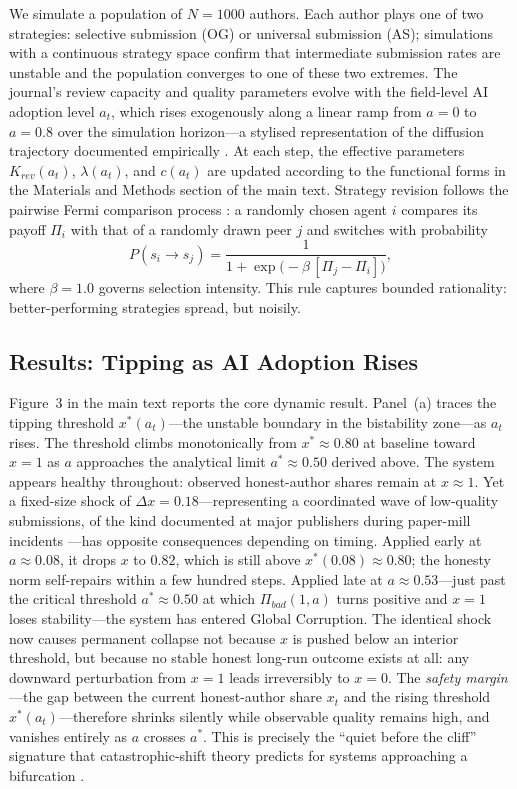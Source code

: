 \documentclass{article}
\begin{document}
We simulate a population of $N = 1000$ authors.
Each author plays one of two strategies: selective submission (OG) or universal submission (AS); simulations with a continuous strategy space confirm that intermediate submission rates are unstable and the population converges to one of these two extremes.
The journal's review capacity and quality parameters evolve with the field-level AI adoption level $a_t$, which rises exogenously along a linear ramp from $a = 0$ to $a = 0.8$ over the simulation horizon---a stylised representation of the diffusion trajectory documented empirically \citep{arXiv2024, Liang2025}.
At each step, the effective parameters $K_{rev}(a_t)$, $\lambda(a_t)$, and $c(a_t)$ are updated according to the functional forms in the Materials and Methods section of the main text.
Strategy revision follows the pairwise Fermi comparison process \citep{Szabo1998, Traulsen2009}: a randomly chosen agent $i$ compares its payoff $\Pi_i$ with that of a randomly drawn peer $j$ and switches with probability
\begin{equation}
    P(s_i \to s_j) = \frac{1}{1 + \exp\!\bigl(-\beta\,[\Pi_j - \Pi_i]\bigr)},
\end{equation}
where $\beta = 1.0$ governs selection intensity.
This rule captures bounded rationality: better-performing strategies spread, but noisily.

\subsection{Results: Tipping as AI Adoption Rises}

Figure~3 in the main text reports the core dynamic result.
Panel~(a) traces the tipping threshold $x^*(a_t)$---the unstable boundary in the bistability zone---as $a_t$ rises.
The threshold climbs monotonically from $x^* \approx 0.80$ at baseline toward $x = 1$ as $a$ approaches the analytical limit $a^* \approx 0.50$ derived above.
The system appears healthy throughout: observed honest-author shares remain at $x \approx 1$.
Yet a fixed-size shock of $\Delta x = 0.18$---representing a coordinated wave of low-quality submissions, of the kind documented at major publishers during paper-mill incidents \citep{Bik2016}---has opposite consequences depending on timing.
Applied early at $a \approx 0.08$, it drops $x$ to $0.82$, which is still above $x^*(0.08) \approx 0.80$; the honesty norm self-repairs within a few hundred steps.
Applied late at $a \approx 0.53$---just past the critical threshold $a^* \approx 0.50$ at which $\Pi_{bad}(1,a)$ turns positive and $x=1$ loses stability---the system has entered Global Corruption.
The identical shock now causes permanent collapse not because $x$ is pushed below an interior threshold, but because no stable honest long-run outcome exists at all: any downward perturbation from $x=1$ leads irreversibly to $x=0$.
The \emph{safety margin}---the gap between the current honest-author share $x_t$ and the rising threshold $x^*(a_t)$---therefore shrinks silently while observable quality remains high, and vanishes entirely as $a$ crosses $a^*$.
This is precisely the ``quiet before the cliff'' signature that catastrophic-shift theory predicts for systems approaching a bifurcation \citep{Scheffer2009}.
\end{document}

